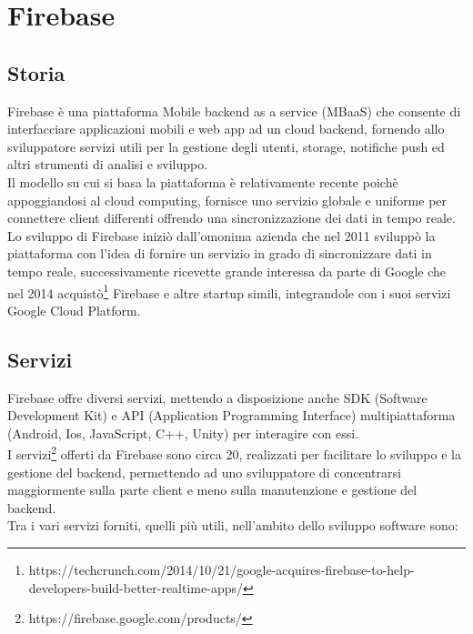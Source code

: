 \chapter{Firebase}                %
\lhead[\fancyplain{}{\bfseries\thepage}]{\fancyplain{}{\bfseries\rightmark}}
\section{Storia}                 %


Firebase è una piattaforma Mobile backend as a service (MBaaS) che consente
di interfacciare applicazioni mobili e web app ad un cloud backend, fornendo allo sviluppatore servizi utili per la gestione degli utenti, storage, notifiche push ed altri strumenti di analisi e sviluppo.\\
Il modello su cui si basa la piattaforma è relativamente recente poichè appoggiandosi al cloud computing, fornisce uno servizio globale e uniforme per connettere client differenti offrendo una sincronizzazione dei dati in tempo reale.\\
Lo sviluppo di Firebase iniziò dall'omonima azienda che nel 2011 sviluppò la piattaforma con l'idea di fornire un servizio in grado di sincronizzare dati in tempo reale, successivamente ricevette grande interessa da parte di Google che nel 2014 acquistò\footnote{https://techcrunch.com/2014/10/21/google-acquires-firebase-to-help-developers-build-better-realtime-apps/} Firebase e altre startup simili, integrandole con i suoi servizi Google Cloud Platform.






\section{Servizi}                 %
Firebase offre diversi servizi, mettendo a disposizione anche SDK (Software Development Kit) e API (Application Programming Interface) multipiattaforma (Android, Ios, JavaScript, C++, Unity) per interagire con essi.\\
I servizi\footnote{https://firebase.google.com/products/} offerti da Firebase sono circa 20, realizzati per facilitare lo sviluppo e la gestione del backend, permettendo ad uno sviluppatore di concentrarsi maggiormente sulla parte client e meno sulla manutenzione e gestione del backend.\\
Tra i vari servizi forniti, quelli più utili, nell'ambito dello sviluppo software sono:


